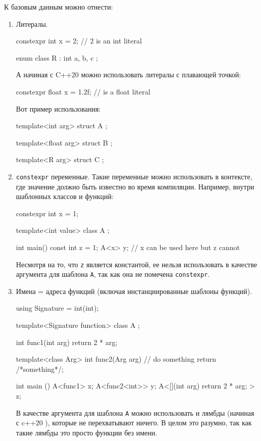 К базовым данным можно отнести:
\begin{enumerate}
\item Литералы.
\begin{cppcode}
constexpr int x = 2; // 2 is an int literal

enum class R : int { a, b, c };
\end{cppcode}
А начиная с C++20 можно использовать литералы с плавающей точкой:
\begin{cppcode}
constexpr float x = 1.2f; // is a float literal
\end{cppcode}
Вот пример использования:
\begin{cppcode}
template<int arg>
struct A {};

template<float arg>
struct B {};

template<R arg>
struct C {};
\end{cppcode}

\item \verb"constexpr" переменные.
Такие переменные можно использовать в контексте, где значение должно быть известно во время компиляции.
Например, внутри шаблонных классов и функций:
\begin{cppcode}
constexpr int x = 1;

template<int value>
class A {};

int main() {
  const int z = 1;
  A<x> y; // x can be used here but z cannot
}
\end{cppcode}
Несмотря на то, что \verb"z" является константой, ее нельзя использовать в качестве аргумента для шаблона \verb"A", так как она не помечена \verb"constexpr".

\item Имена = адреса функций (включая инстанциированные шаблоны функций).
\begin{cppcode}
using Signature = int(int);

template<Signature function>
class A {};

int func1(int arg) {
  return 2 * arg;
}

template<class Arg>
int func2(Arg arg) {
  // do something
  return /*something*/;
}

int main () {
  A<func1> x;
  A<func2<int>> y;
  A<[](int arg) { return 2 * arg; }> z;
}
\end{cppcode}
В качестве аргумента для шаблона \verb"A" можно использовать и лямбды (начиная с c++20 ), которые не перехватывают ничего.
В целом это разумно, так как такие лямбды это просто функции без имени.


\end{enumerate}
